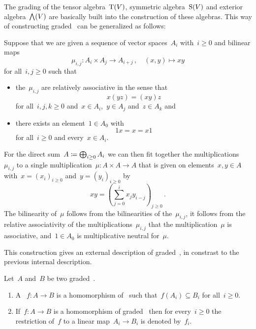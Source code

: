 \begin{remark}
  \label{external description of graded algebras}
  The grading of the tensor algebra~$\operatorname{T}(V)$, symmetric algebra~$\operatorname{S}(V)$ and exterior algebra~$\bigwedge(V)$ are basically built into the construction of these algebras.
  This way of constructing graded~{\algebras{$\kf$}} can be generalized as follows:
  
  Suppose that we are given a sequence of vector spaces~$A_i$ with~$i \geq 0$ and bilinear maps
  \[
    \mu_{i,j}
    \colon
    A_i \times A_j
    \to
    A_{i+j} \,,
    \quad
    (x,y)
    \mapsto
    xy
  \]
  for all~$i, j \geq 0$ such that
  \begin{itemize}
    \item
      the~$\mu_{i, j}$ are relatively associative in the sense that
      \[
        x(yz)
        =
        (xy)z
      \]
      for all~$i, j, k \geq 0$ and~$x \in A_i$,~$y \in A_j$ and~$z \in A_k$ and
    \item
      there exists an element~$1 \in A_0$ with
      \[
        1 x
        =
        x
        =
        x 1
      \]
      for all~$i \geq 0$ and every~$x \in A_i$.
  \end{itemize}
  For the direct sum~$A \coloneqq \bigoplus_{i \geq 0} A_i$ we can then fit together the multiplications~$\mu_{i,j}$ to a single multiplication~$\mu \colon A \times A \to A$ that is given on elements~$x, y \in A$ with~$x = (x_i)_{i \geq 0}$ and~$y = (y_i)_{i \geq 0}$ by
  \[
    x y
    =
    \left( \sum_{j=0}^i x_j y_{i-j} \right)_{j \geq 0}  \,.
  \]
  The bilinearity of~$\mu$ follows from the bilinearities of the~$\mu_{i,j}$, it follows from the relative associativity of the multiplications~$\mu_{i,j}$ that the multiplication~$\mu$ is associative, and~$1 \in A_0$ is multiplicative neutral for~$\mu$.
  
  This construction gives an external description of graded~{\algebras{$\kf$}}, in constrast to the previous internal description.
\end{remark}


\begin{definition}
  Let~$A$ and~$B$ be two graded~\algebras{$\kf$}.
  \begin{enumerate}
    \item
      A ~$f \colon A \to B$ is a homomorphism of~{\algebras{$\kf$}} such that~$f(A_i) \subseteq B_i$ for all~$i \geq 0$.
    \item
      If~$f \colon A \to B$ is a homomorphism of graded~{\algebras{$\kf$}} then for every~$i \geq 0$ the restriction of~$f$ to a linear map~$A_i \to B_i$ is denoted by~$f_i$.
  \end{enumerate}
\end{definition}



